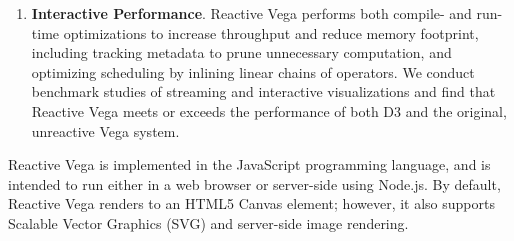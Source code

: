 \begin{enumerate}
  \item \textbf{Interactive Performance}. Reactive Vega performs both compile-
and run-time optimizations to increase throughput and reduce memory footprint,
including tracking metadata to prune unnecessary computation, and optimizing
scheduling by inlining linear chains of operators. We conduct benchmark
studies of streaming and interactive visualizations and find that Reactive
Vega meets or exceeds the performance of both D3 and the original, unreactive
Vega system.
\end{enumerate}

Reactive Vega is implemented in the JavaScript programming language, and is
intended to run either in a web browser or server-side using Node.js. By
default, Reactive Vega renders to an HTML5 Canvas element; however, it also
supports Scalable Vector Graphics (SVG) and server-side image rendering.




